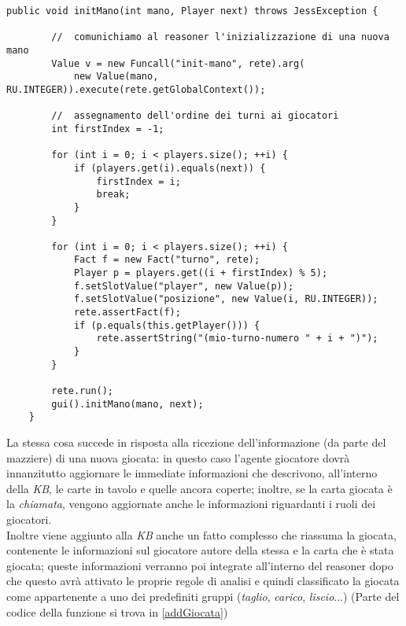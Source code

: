 \begin{lstlisting}[caption={il metodo \texttt{initMano} di PlayerAgent},label=initMano]
    public void initMano(int mano, Player next) throws JessException {

        //  comunichiamo al reasoner l'inizializzazione di una nuova mano
        Value v = new Funcall("init-mano", rete).arg(
            new Value(mano, RU.INTEGER)).execute(rete.getGlobalContext());

        //  assegnamento dell'ordine dei turni ai giocatori
        int firstIndex = -1;

        for (int i = 0; i < players.size(); ++i) {
            if (players.get(i).equals(next)) {
                firstIndex = i;
                break;
            }
        }

        for (int i = 0; i < players.size(); ++i) {
            Fact f = new Fact("turno", rete);
            Player p = players.get((i + firstIndex) % 5);
            f.setSlotValue("player", new Value(p));
            f.setSlotValue("posizione", new Value(i, RU.INTEGER));
            rete.assertFact(f);
            if (p.equals(this.getPlayer())) {
                rete.assertString("(mio-turno-numero " + i + ")");
            }
        }

        rete.run();
        gui().initMano(mano, next);
    }
\end{lstlisting}



La stessa cosa succede in risposta alla ricezione dell'informazione (da parte del mazziere) di una nuova giocata: in questo caso l'agente giocatore dovrà innanzitutto aggiornare le immediate informazioni che descrivono, all'interno della \emph{KB}, le carte in tavolo e quelle ancora coperte; inoltre, se la carta giocata è la \emph{chiamata}, vengono aggiornate anche le informazioni riguardanti i ruoli dei giocatori.\\
Inoltre viene aggiunto alla \emph{KB} anche un fatto complesso che riassuma la giocata, contenente le informazioni sul giocatore autore della stessa e la carta che è stata giocata; queste informazioni verranno poi integrate all'interno del reasoner dopo che questo avrà attivato le proprie regole di analisi e quindi classificato la giocata come appartenente a uno dei predefiniti gruppi (\emph{taglio}, \emph{carico}, \emph{liscio}...) (Parte del codice della funzione si trova in \ref{addGiocata})

